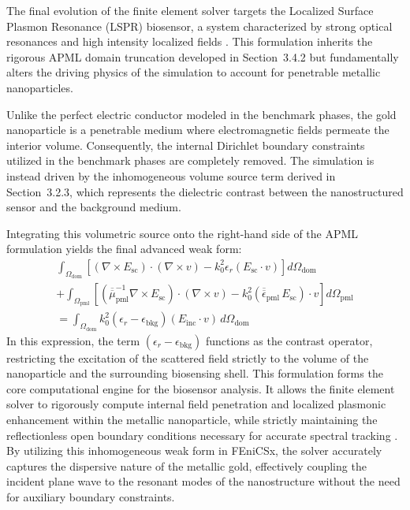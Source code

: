 The final evolution of the finite element solver targets the Localized Surface Plasmon Resonance (LSPR) biosensor, a system characterized by strong optical resonances and high intensity localized fields \citep{Grand2020-we}. This formulation inherits the rigorous APML domain truncation developed in Section~3.4.2 but fundamentally alters the driving physics of the simulation to account for penetrable metallic nanoparticles.

\vspace{12pt}

Unlike the perfect electric conductor modeled in the benchmark phases, the gold nanoparticle is a penetrable medium where electromagnetic fields permeate the interior volume. Consequently, the internal Dirichlet boundary constraints utilized in the benchmark phases are completely removed. The simulation is instead driven by the inhomogeneous volume source term derived in Section~3.2.3, which represents the dielectric contrast between the nanostructured sensor and the background medium.

\vspace{12pt}

Integrating this volumetric source onto the right-hand side of the APML formulation yields the final advanced weak form:
\begin{multline}
\int_{\Omega_{\text{dom}}} \left[ (\nabla \times E_{\text{sc}}) \cdot (\nabla \times v) - k_0^2 \epsilon_r (E_{\text{sc}} \cdot v) \right] d\Omega_{\text{dom}} \\
+ \int_{\Omega_{\text{pml}}} \left[ \left(\overline{\overline{\mu}}_{\text{pml}}^{-1} \nabla \times E_{\text{sc}}\right) \cdot (\nabla \times v) - k_0^2 \left(\overline{\overline{\epsilon}}_{\text{pml}} \, E_{\text{sc}}\right) \cdot v \right] d\Omega_{\text{pml}} \\
= \int_{\Omega_{\text{dom}}} k_0^2 \left(\epsilon_r - \epsilon_{\text{bkg}}\right) (E_{\text{inc}} \cdot v) \, d\Omega_{\text{dom}}
\label{eq:weak_form_lspr}
\end{multline}
In this expression, the term $(\epsilon_r - \epsilon_{\text{bkg}})$ functions as the contrast operator, restricting the excitation of the scattered field strictly to the volume of the nanoparticle and the surrounding biosensing shell. This formulation forms the core computational engine for the biosensor analysis. It allows the finite element solver to rigorously compute internal field penetration and localized plasmonic enhancement within the metallic nanoparticle, while strictly maintaining the reflectionless open boundary conditions necessary for accurate spectral tracking \citep{Grand2020-we}. By utilizing this inhomogeneous weak form in FEniCSx, the solver accurately captures the dispersive nature of the metallic gold, effectively coupling the incident plane wave to the resonant modes of the nanostructure without the need for auxiliary boundary constraints.


